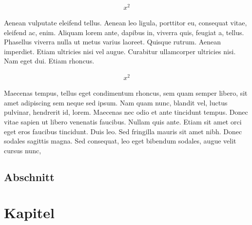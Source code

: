 \documentclass[twoside,12pt]{scrartcl}
\begin{document}
	\begin{align}
	x^2
	\end{align}	
	
	Aenean vulputate eleifend tellus. Aenean leo ligula, porttitor eu, consequat vitae, eleifend ac, enim. Aliquam lorem ante, dapibus in, viverra quis, feugiat a, tellus. Phasellus viverra nulla ut metus varius laoreet. Quisque rutrum. Aenean imperdiet. Etiam ultricies nisi vel augue. Curabitur ullamcorper ultricies nisi. Nam eget dui. Etiam rhoncus. 
	
	\begin{align*}
	x^2
	\end{align*}	
	
	Maecenas tempus, tellus eget condimentum rhoncus, sem quam semper libero, sit amet adipiscing sem neque sed ipsum. Nam quam nunc, blandit vel, luctus pulvinar, hendrerit id, lorem. Maecenas nec odio et ante tincidunt tempus. Donec vitae sapien ut libero venenatis faucibus. Nullam quis ante. Etiam sit amet orci eget eros faucibus tincidunt. Duis leo. Sed fringilla mauris sit amet nibh. Donec sodales sagittis magna. Sed consequat, leo eget bibendum sodales, augue velit cursus nunc, 
	
	
	\Blindtext
	
	\listoffigures
	
	\blindtext
	\subsection{Abschnitt}
	
	\listoftables
	
	\blindtext
	
	\section{Kapitel}
	\Blindtext
	
	\lstlistoflistings
	
	\printglossary[style=altlist,title=Glossar]
	\newpage
	
				
	 
	
\end{document}
